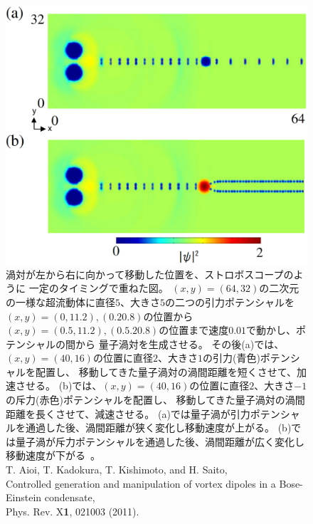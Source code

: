 \documentclass[12pt,a4paper]{jbook}
\begin{document}
		\begin{figure}[H]
			\centering
			\includegraphics[width=13cm]{internal.eps}
			\caption{
                渦対が左から右に向かって移動した位置を、ストロボスコープのように
                一定のタイミングで重ねた図。
                $(x,y)=(64,32)$の二次元の一様な超流動体に直径$5$、大きさ$5$の二つの引力ポテンシャルを
                $(x,y)=(0,11.2),(0.20.8)$の位置から
                $(x,y)=(0.5,11.2),(0.5.20.8)$の位置まで速度$0.01$で動かし、ポテンシャルの間から
                量子渦対を生成させる。
                その後(a)では、$(x,y)=(40,16)$の位置に直径$2$、大きさ$1$の引力(青色)ポテンシャルを配置し、
                移動してきた量子渦対の渦間距離を短くさせて、加速させる。
                (b)では、$(x,y)=(40,16)$の位置に直径$2$、大きさ$-1$の斥力(赤色)ポテンシャルを配置し、
                移動してきた量子渦対の渦間距離を長くさせて、減速させる。
			    (a)では量子渦が引力ポテンシャルを通過した後、渦間距離が狭く変化し移動速度が上がる。
			    (b)では量子渦が斥力ポテンシャルを通過した後、渦間距離が広く変化し移動速度が下がる~\cite{Aioi0}。
                \\
		        T. Aioi, T. Kadokura, T. Kishimoto, and H. Saito,
                \\
		        Controlled generation and manipulation of vortex dipoles in a Bose-Einstein condensate, 
                \\
		        Phys. Rev. X{\bf 1}, 021003 (2011).
			}
			\label{FIG:internal}
		\end{figure}
\end{document}
